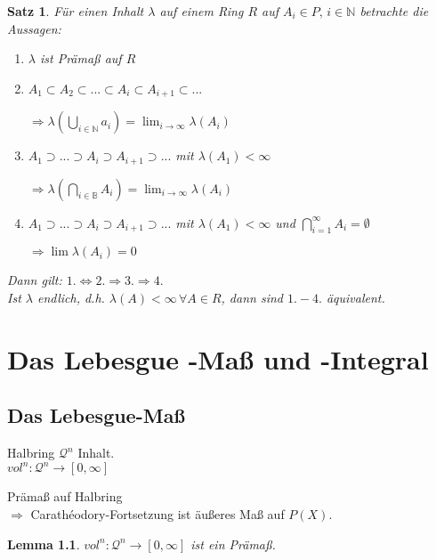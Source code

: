 \documentclass[11pt]{memoir}
\theoremstyle{changebreak}
\newtheorem{Lemma}{Lemma}[chapter]
\newtheorem{Satz}{Satz}[chapter]
\newcommand{\cara}{Carathéodory-Fortsetzung}
\begin{document}
\begin{Satz}
Für einen Inhalt $\lambda$ auf einem Ring $R$ auf $A_i \in P,\, i \in \mathbb N$ betrachte die Aussagen:
\begin{enumerate}
	\item $\lambda$ ist Prämaß auf $R$
	\item $A_1 \subset A_2 \subset ... \subset A_i \subset A_{i+1} \subset ...$
	\begin{center}
		$\Rightarrow \lambda\left( \bigcup_{i \in \mathbb N} a_i \right) = \lim_{i \rightarrow \infty} \lambda(A_i)$
	\end{center}
	\item $A_1 \supset ... \supset A_i \supset A_{i+1} \supset ...$ mit $\lambda(A_1) < \infty$
	\begin{center}
		$\Rightarrow \lambda\left(\bigcap_{i \in \mathbb B} A_i \right) = \lim_{i\rightarrow \infty} \lambda(A_i)$
	\end{center}
	\item $A_1 \supset ... \supset A_i \supset A_{i+1} \supset ...$ mit $\lambda(A_1) <  \infty$ und $\bigcap\limits_{i=1}^\infty A_i = \emptyset$
	\begin{center}
		$\Rightarrow \lim \lambda(A_i) = 0$
	\end{center}
\end{enumerate}
Dann gilt: $1. \Leftrightarrow 2. \Rightarrow 3. \Rightarrow 4.$ \\
Ist $\lambda$ endlich, d.h. $\lambda(A) < \infty \, \forall A \in R$, dann sind $1. - 4.$ äquivalent.
\end{Satz}


\newpage

\chapter{Das Lebesgue -Maß und -Integral}
\section{Das Lebesgue-Maß}

Halbring $\mathscr{Q}^n$ Inhalt.\\
$vol^n : \mathscr{Q}^n \rightarrow [0, \infty]$


	Prämaß auf Halbring\\
	$\Rightarrow$ \cara{} ist äußeres Maß auf $P(X)$.

\begin{Lemma}
	$vol^n : \mathscr{Q}^n \rightarrow [0, \infty]$ ist ein Prämaß.
\end{Lemma}
\end{document}
